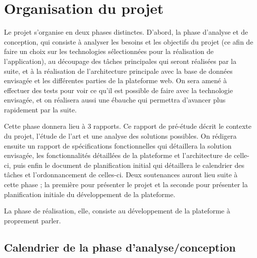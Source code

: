 \section{Organisation du projet}
\label{sec:organisation}
    Le projet s’organise en deux phases distinctes. D'abord, la phase d’analyse et de conception, qui consiste
    à analyser les besoins et les objectifs du projet (ce afin de faire un choix sur les technologies
    sélectionnées pour la réalisation de l’application), au découpage des tâches principales qui seront
    réalisées par la suite, et à la réalisation de l’architecture principale avec la base de données envisagée
    et les différentes parties de la plateforme web. On sera amené à effectuer des tests pour voir ce qu’il
    est possible de faire avec la technologie envisagée, et on réalisera aussi une ébauche qui permettra
    d’avancer plus rapidement par la suite.

    Cette phase donnera lieu à 3 rapports. Ce rapport de pré-étude décrit le contexte du projet,
    l’étude de l’art et une analyse des solutions possibles. On rédigera ensuite un rapport de spécifications fonctionnelles
    qui détaillera la solution envisagée, les fonctionnalités détaillées de la plateforme et l’architecture
    de celle-ci, puis enfin le document de planification initial qui détaillera le calendrier des tâches et
    l’ordonnancement de celles-ci. Deux soutenances auront lieu suite à cette phase ; la première pour présenter
    le projet et la seconde pour présenter la planification initiale du développement de la plateforme.

    La phase de réalisation, elle, consiste au développement de la plateforme à proprement parler.

    \subsection{Calendrier de la phase d’analyse/conception}
    \label{subsec:calendrier}

